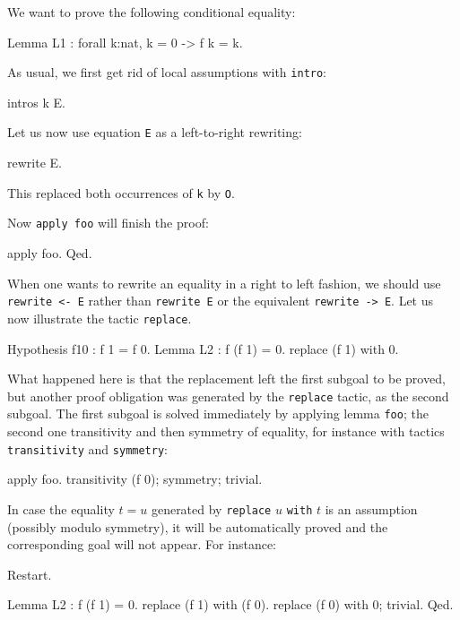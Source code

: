 \documentclass[11pt,a4paper]{book}
\begin{document}
We want to prove the following conditional equality:
\begin{coq_example*}
Lemma L1 : forall k:nat, k = 0 -> f k = k.
\end{coq_example*}

As usual, we first get rid of local assumptions with \verb:intro::
\begin{coq_example}
intros k E.
\end{coq_example}

Let us now use equation \verb:E: as a left-to-right rewriting:
\begin{coq_example}
rewrite E.
\end{coq_example}
This replaced both occurrences of \verb:k: by \verb:O:. 

Now \verb:apply foo: will finish the proof:

\begin{coq_example}
apply foo.
Qed.
\end{coq_example}

When one wants to rewrite an equality in a right to left fashion, we should
use \verb:rewrite <- E: rather than \verb:rewrite E: or the equivalent
\verb:rewrite -> E:. 
Let us now illustrate the tactic \verb:replace:.
\begin{coq_example}
Hypothesis f10 : f 1 = f 0.
Lemma L2 : f (f 1) = 0.
replace (f 1) with 0.
\end{coq_example}
What happened here is that the replacement left the first subgoal to be
proved, but another proof obligation was generated by the \verb:replace:
tactic, as the second subgoal. The first subgoal is solved immediately
by applying lemma \verb:foo:; the second one transitivity and then 
symmetry of equality, for instance with tactics \verb:transitivity: and 
\verb:symmetry::
\begin{coq_example}
apply foo.
transitivity (f 0); symmetry; trivial.
\end{coq_example}
In case the equality $t=u$ generated by \verb:replace: $u$ \verb:with:
$t$ is an assumption
(possibly modulo symmetry), it will be automatically proved and the
corresponding goal will not appear. For instance:

\begin{coq_eval}
Restart.
\end{coq_eval}
\begin{coq_example}
Lemma L2 : f (f 1) = 0.
replace (f 1) with (f 0).
replace (f 0) with 0; trivial.
Qed.
\end{coq_example}
\end{document}
